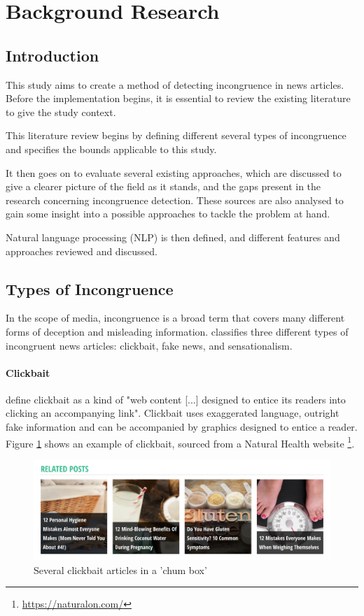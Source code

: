 \section{Background Research}\label{lit}
\subsection{Introduction}
This study aims to create a method of detecting incongruence in news articles. Before the implementation begins, it is essential to review the existing literature to give the study context.

This literature review begins by defining different several types of incongruence and specifies the bounds applicable to this study. 

It then goes on to evaluate several existing approaches, which are discussed to give a clearer picture of the field as it stands, and the gaps present in the research concerning incongruence detection. These sources are also analysed to gain some insight into a possible approaches to tackle the problem at hand.

Natural language processing (NLP) is then defined, and different features and approaches reviewed and discussed.

\subsection{Types of Incongruence}

In the scope of media, incongruence is a broad term that covers many different forms of deception and misleading information.  classifies three different types of incongruent news articles: clickbait, fake news, and sensationalism.

\paragraph{Clickbait}
 define clickbait as a kind of "web content [...] designed to entice its readers into clicking an accompanying link". Clickbait uses exaggerated language, outright fake information and can be accompanied by graphics designed to entice a reader. Figure \ref{fig:clickbait} shows an example of clickbait, sourced from a Natural Health website \footnote{\url{https://naturalon.com/}}.

\begin{figure}[ht!]
  \includegraphics[width=\linewidth]{images/clickbait.png}
  \caption{Several clickbait articles in a 'chum box'}
  \label{fig:clickbait}
\end{figure}

